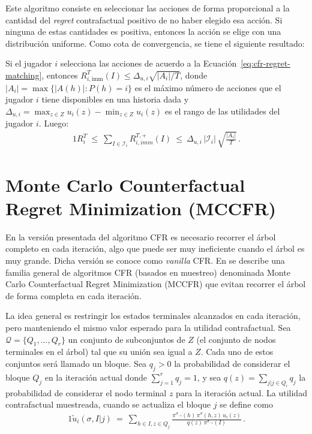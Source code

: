 Este algoritmo consiste en seleccionar las acciones de forma proporcional a la cantidad del \textit{regret} contrafactual positivo de no haber elegido esa acción. Si ninguna de estas cantidades es positiva, entonces la acción se elige con una distribución uniforme. Como cota de convergencia, se tiene el siguiente resultado:

\begin{theorem}
Si el jugador $i$ selecciona las acciones de acuerdo a la Ecuación~\ref{eq:cfr-regret-matching}, entonces $R^T_{i, \text{imm}}(I) \leq \Delta_{u, i} \sqrt{|A_i|/T}$, donde $|A_i| = \max \{ |A(h)| : P(h) = i \}$ es el máximo número de acciones que el jugador $i$ tiene disponibles en una historia dada y  $\Delta_{u,i} = \max_{z \in Z}u_i(z) - \min_{z \in Z}u_i(z)$ es el rango de las utilidades del jugador $i$. Luego:
\begin{alignat}{1}
R_i^T\ \leq\ \sum_{I\in\mathcal{I}_i} R^{T,+}_{i,imm}(I) \ 
        \leq\ \Delta_{u,i}\,|\mathcal{I}_i|\,\sqrt{\frac{|A_i|}{T}} \,.
\end{alignat}
\end{theorem}


\section{Monte Carlo Counterfactual Regret Minimization (MCCFR)}

En la versión presentada del algoritmo CFR es necesario recorrer el árbol completo en cada iteración, algo que puede ser muy ineficiente cuando el árbol es muy grande. Dicha versión se conoce como \textit{vanilla} CFR. En \cite{bib:montecarlo-cfr} se describe una familia general de algoritmos CFR (basados en muestreo) denominada Monte Carlo Counterfactual Regret Minimization (MCCFR) que evitan recorrer el árbol de forma completa en cada iteración.

La idea general es restringir los estados terminales alcanzados en cada iteración, pero manteniendo el mismo valor esperado para la utilidad contrafactual. Sea $\mathcal{Q} = \{Q_1,..., Q_r\}$ un conjunto de subconjuntos de $Z$ (el conjunto de nodos terminales en el árbol) tal que su unión sea igual a $Z$. Cada uno de estos conjuntos será llamado un bloque. Sea $q_j > 0$ la probabilidad de considerar el bloque $Q_j$ en la iteración actual donde $\sum_{j = 1}^r {q_j} = 1$, y sea $q(z) = \sum_{j | j \in Q_i} q_j$ la probabilidad de considerar el nodo terminal $z$ para la iteración actual. La utilidad contrafactual muestreada, cuando se actualiza el bloque $j$ se define como
\begin{alignat}{1}
\tilde{u}_i(\sigma, I | j)\ =\ \sum_{h \in I, z \in Q_j} \frac{\pi^{\sigma_{-i}}(h)\,\pi^{\sigma}(h, z)\, u_i(z)}{q(z)\,\pi^{\sigma_{-i}}(I)} \,.
\end{alignat}

